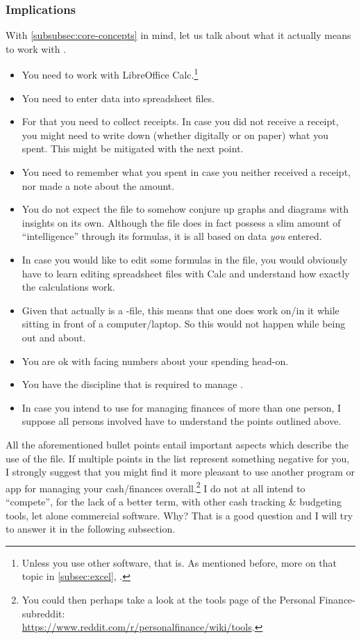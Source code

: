 \subsubsection{Implications}
\label{subsubsec:implications}

With \autoref{subsubsec:core-concepts} in mind, let us talk about what it actually means to work with \tfn.

\begin{itemize}
	\item You need to work with LibreOffice Calc.\footnote{Unless you use other software, that is.
	As mentioned before, more on that topic in \autoref{subsec:excel}, .}
	\item You need to enter data into spreadsheet files.
	\item For that you need to collect receipts.
	In case you did not receive a receipt, you might need to write down (whether digitally or on paper) what you spent.
	This might be mitigated with the next point.
	\item You need to remember what you spent in case you neither received a receipt, nor made a note about the amount.
	\item You do not expect the file to somehow conjure up graphs and diagrams with insights on its own.
	Although the file does in fact possess a slim amount of ``intelligence'' through its formulas, it is all based on data \emph{you} entered.
	\item In case you would like to edit some formulas in the file, you would obviously have to learn editing spreadsheet files with Calc and understand how exactly the calculations work.
	\item Given that \tfn actually is a -file, this means that one does work on/in it while sitting in front of a computer/laptop.
	So this would not happen while being out and about.
	\item You are ok with facing numbers about your spending head-on.
	\item You have the discipline that is required to manage \tfn.
	\item In case you intend to use \tfn for managing finances of more than one person, I suppose all persons involved have to understand the points outlined above.
\end{itemize}

All the aforementioned bullet points entail important aspects which describe the use of the file.
If multiple points in the list represent something negative for you, I strongly suggest that you might find it more pleasant to use another program or app for managing your cash/finances overall.\footnote{You could then perhaps take a look at the tools page of the Personal Finance-subreddit:\\
\href{https://www.reddit.com/r/personalfinance/wiki/tools}{https://www.reddit.com/r/personalfinance/wiki/tools}.}
I do not at all intend to "`compete"', for the lack of a better term, with other cash tracking \& budgeting tools, let alone commercial software.
Why?
That is a good question and I will try to answer it in the following subsection.

